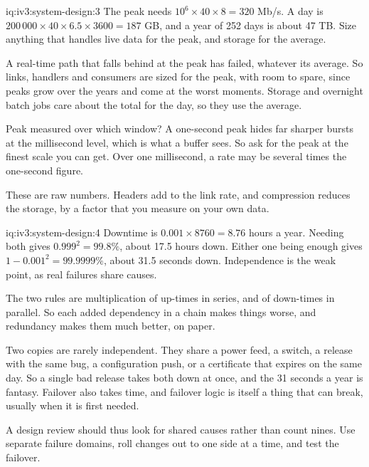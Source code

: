 \begin{solution}{iq:iv3:system-design:3}
The peak needs $10^6 \times 40 \times 8 = 320$ Mb/s. A day is $200\,000 \times 40 \times 6.5 \times 3600 = 187$ GB, and a year of 252 days is about 47 TB. Size anything that handles live data for the peak, and storage for the average.

A real-time path that falls behind at the peak has failed, whatever its average. So links, handlers and consumers are sized for the peak, with room to spare, since peaks grow over the years and come at the worst moments. Storage and overnight batch jobs care about the total for the day, so they use the average.

Peak measured over which window? A one-second peak hides far sharper bursts at the millisecond level, which is what a buffer sees. So ask for the peak at the finest scale you can get. Over one millisecond, a rate may be several times the one-second figure.

These are raw numbers. Headers add to the link rate, and compression reduces the storage, by a factor that you measure on your own data.

\end{solution}

\begin{solution}{iq:iv3:system-design:4}
Downtime is $0.001 \times 8760 = 8.76$ hours a year. Needing both gives $0.999^2 = 99.8\%$, about 17.5 hours down. Either one being enough gives $1 - 0.001^2 = 99.9999\%$, about 31.5 seconds down. Independence is the weak point, as real failures share causes.

The two rules are multiplication of up-times in series, and of down-times in parallel. So each added dependency in a chain makes things worse, and redundancy makes them much better, on paper.

Two copies are rarely independent. They share a power feed, a switch, a release with the same bug, a configuration push, or a certificate that expires on the same day. So a single bad release takes both down at once, and the 31 seconds a year is fantasy. Failover also takes time, and failover logic is itself a thing that can break, usually when it is first needed.

A design review should thus look for shared causes rather than count nines. Use separate failure domains, roll changes out to one side at a time, and test the failover.

\end{solution}

